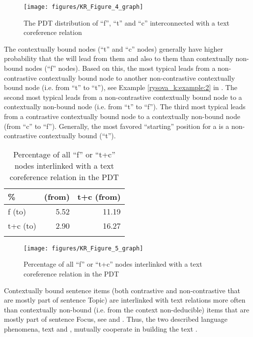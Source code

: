 \documentclass[output=paper]{langsci/langscibook.cls}
\begin{document}
\begin{figure}
\texttt{[image: figures/KR\_Figure\_4\_graph]}
\caption{The PDT distribution of ``f'', ``t'' and ``c'' interconnected with a text coreference relation}
\label{rysova_k:fig:4}
\end{figure}



The contextually bound nodes (``t'' and ``c'' nodes) generally have higher probability that the  will lead from them and also to them than contextually non-bound nodes (``f'' nodes). Based on this, the most typical  leads from a non-contrastive contextually bound node to another non-contrastive contextually bound node (i.e. from ``t'' to ``t''), see Example \ref{rysova_k:example:2} in . The second most typical  leads from a non-contrastive contextually bound node to a contextually non-bound node (i.e. from ``t'' to ``f''). The third most typical  leads from a contrastive contextually bound node to a contextually non-bound node (from ``c'' to ``f''). Generally, the most favored ``starting'' position for a  is a non-contrastive contextually bound  (``t'').



\begin{table}
\caption{Percentage of all ``f'' or ``t+c'' nodes interlinked with a text coreference relation in the PDT}
\begin{tabular}{lrr}
\lsptoprule
\% &
(from) &
t+c (from)\\
\midrule
f (to) &
5.52 &
11.19\\
t+c (to) &
2.90 &
16.27\\
\lspbottomrule
\end{tabular}
\label{rysova_k:tab:3}
\end{table}

\begin{figure} 
\texttt{[image: figures/KR\_Figure\_5\_graph]}
\caption{Percentage of all ``f'' or ``t+c'' nodes interlinked with a text coreference relation in the PDT}
\label{rysova_k:fig:5}
\end{figure}


Contextually bound sentence items (both contrastive and non-contrastive that are mostly part of sentence Topic) are interlinked with text  relations more often than contextually non-bound (i.e. from the context non-deducible) items that are mostly part of sentence Focus, see  and . Thus, the two described language phenomena, text  and , mutually cooperate in building the text .
\end{document}
